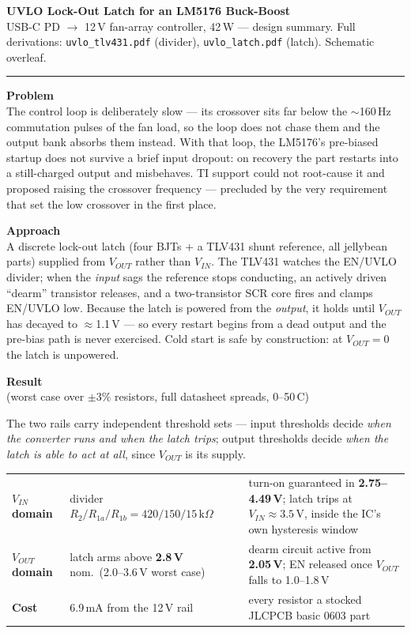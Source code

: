 \documentclass[10pt]{article}
\newcommand{\hd}[1]{\vspace{2pt}\textbf{\large #1}\vspace{1pt}\\}
\begin{document}
{\LARGE\textbf{UVLO Lock-Out Latch for an LM5176 Buck-Boost}}\\[2pt]
{\small USB-C PD $\to$ 12\,V fan-array controller, 42\,W --- design summary.
Full derivations: \texttt{uvlo\_tlv431.pdf} (divider), \texttt{uvlo\_latch.pdf}
(latch). Schematic overleaf.}

\vspace{4pt}\hrule\vspace{5pt}

\hd{Problem}
The control loop is deliberately slow --- its crossover sits far below the
$\sim$160\,Hz commutation pulses of the fan load, so the loop does not chase
them and the output bank absorbs them instead. With that loop, the LM5176's
pre-biased startup does not survive a brief input dropout: on recovery the
part restarts into a still-charged output and misbehaves. TI support could not
root-cause it and proposed raising the crossover frequency --- precluded by the
very requirement that set the low crossover in the first place.

\hd{Approach}
A discrete lock-out latch (four BJTs + a TLV431 shunt reference, all jellybean
parts) supplied from $V_{OUT}$ rather than $V_{IN}$. The TLV431 watches the
EN/UVLO divider; when the \emph{input} sags the reference stops conducting, an
actively driven ``dearm'' transistor releases, and a two-transistor SCR core
fires and clamps EN/UVLO low. Because the latch is powered from the
\emph{output}, it holds until $V_{OUT}$ has decayed to $\approx$1.1\,V --- so
every restart begins from a dead output and the pre-bias path is never
exercised. Cold start is safe by construction: at $V_{OUT}=0$ the latch is
unpowered.

\hd{Result} (worst case over $\pm3\%$ resistors, full datasheet spreads, 0--50\,\textdegree C)

\vspace{-3pt}
The two rails carry independent threshold sets --- input thresholds decide
\emph{when the converter runs and when the latch trips}; output thresholds
decide \emph{when the latch is able to act at all}, since $V_{OUT}$ is its supply.

\vspace{-4pt}
\begin{center}\small
\begin{tabular}{@{}p{}p{}p{}@{}}
\toprule
\textbf{$V_{IN}$ domain} & divider $R_2/R_{1a}/R_{1b}=420/150/15\,\mathrm{k}\Omega$
  & turn-on guaranteed in \textbf{2.75--4.49\,V}; latch trips at
    $V_{IN}\approx3.5$\,V, inside the IC's own hysteresis window \\[3pt]
\textbf{$V_{OUT}$ domain} & latch arms above \textbf{2.8\,V} nom.\
  (2.0--3.6\,V worst case) & dearm circuit active from \textbf{2.05\,V};
  EN released once $V_{OUT}$ falls to 1.0--1.8\,V \\[3pt]
\textbf{Cost} & 6.9\,mA from the 12\,V rail & every resistor a stocked JLCPCB
  basic 0603 part \\
\bottomrule
\end{tabular}
\end{center}
\end{document}
